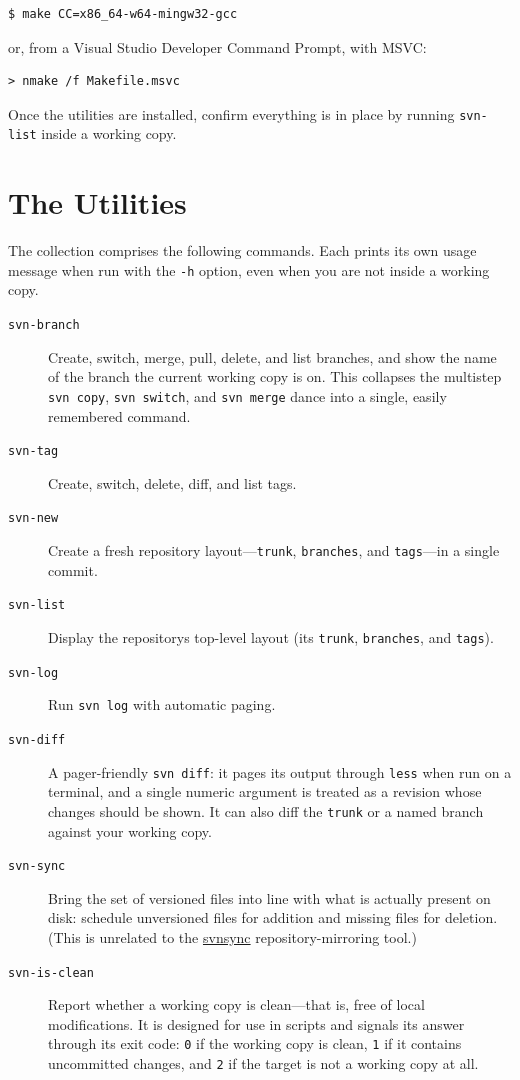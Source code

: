 \begin{verbatim}
$ make CC=x86_64-w64-mingw32-gcc
\end{verbatim}

or, from a Visual Studio Developer Command Prompt, with MSVC:

\begin{verbatim}
> nmake /f Makefile.msvc
\end{verbatim}

Once the utilities are installed, confirm everything is in place by
running \texttt{svn-list} inside a working copy.

\section{The Utilities}\label{svn.utils.commands}

The collection comprises the following commands. Each prints its own usage
message when run with the \texttt{-h} option, even when you are not inside
a working copy.

\begin{description}
\item[\texttt{svn-branch}]
Create, switch, merge, pull, delete, and list branches, and show the name
of the branch the current working copy is on. This collapses the
multistep \texttt{svn\ copy}, \texttt{svn\ switch}, and \texttt{svn\ merge}
dance into a single, easily remembered command.
\item[\texttt{svn-tag}]
Create, switch, delete, diff, and list tags.
\item[\texttt{svn-new}]
Create a fresh repository layout---\texttt{trunk}, \texttt{branches}, and
\texttt{tags}---in a single commit.
\item[\texttt{svn-list}]
Display the repository\textquotesingle s top-level layout (its
\texttt{trunk}, \texttt{branches}, and \texttt{tags}).
\item[\texttt{svn-log}]
Run \texttt{svn\ log} with automatic paging.
\item[\texttt{svn-diff}]
A pager-friendly \texttt{svn\ diff}: it pages its output through
\texttt{less} when run on a terminal, and a single numeric argument is
treated as a revision whose changes should be shown. It can also diff the
\texttt{trunk} or a named branch against your working copy.
\item[\texttt{svn-sync}]
Bring the set of versioned files into line with what is actually present on
disk: schedule unversioned files for addition and missing files for
deletion. (This is unrelated to the \hyperref[svn.ref.svnsync]{svnsync}
repository-mirroring tool.)
\item[\texttt{svn-is-clean}]
Report whether a working copy is clean---that is, free of local
modifications. It is designed for use in scripts and signals its answer
through its exit code: \texttt{0} if the working copy is clean,
\texttt{1} if it contains uncommitted changes, and \texttt{2} if the
target is not a working copy at all.
\end{description}
